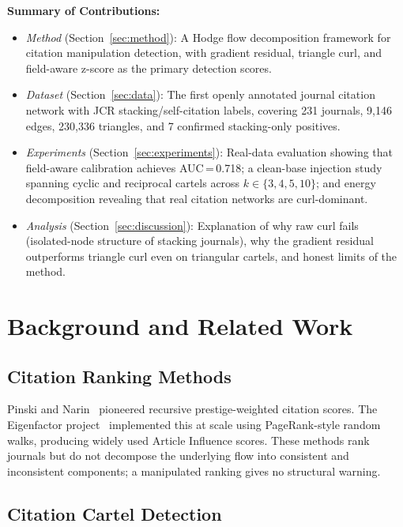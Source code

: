 \documentclass[twocolumn,11pt,letterpaper]{article}
\begin{document}
\smallskip\noindent\textbf{Summary of Contributions:}
\begin{itemize}
  \item \emph{Method} (Section~\ref{sec:method}): A Hodge flow decomposition
    framework for citation manipulation detection, with gradient residual,
    triangle curl, and field-aware z-score as the primary detection scores.
  \item \emph{Dataset} (Section~\ref{sec:data}): The first openly annotated
    journal citation network with JCR stacking/self-citation labels, covering
    231 journals, 9,146 edges, 230,336 triangles, and 7 confirmed
    stacking-only positives.
  \item \emph{Experiments} (Section~\ref{sec:experiments}): Real-data
    evaluation showing that field-aware calibration achieves AUC\,=\,0.718;
    a clean-base injection study spanning cyclic and reciprocal cartels across
    $k \in \{3,4,5,10\}$; and energy decomposition revealing that real
    citation networks are curl-dominant.
  \item \emph{Analysis} (Section~\ref{sec:discussion}): Explanation of why
    raw curl fails (isolated-node structure of stacking journals), why the
    gradient residual outperforms triangle curl even on triangular cartels,
    and honest limits of the method.
\end{itemize}

\section{Background and Related Work}

\subsection{Citation Ranking Methods}

Pinski and Narin~\cite{Pinski1976} pioneered recursive prestige-weighted
citation scores. The Eigenfactor project~\cite{West2010,Bergstrom2007}
implemented this at scale using PageRank-style random walks, producing widely
used Article Influence scores. These methods rank journals but do not decompose
the underlying flow into consistent and inconsistent components; a manipulated
ranking gives no structural warning.

\subsection{Citation Cartel Detection}
\end{document}
